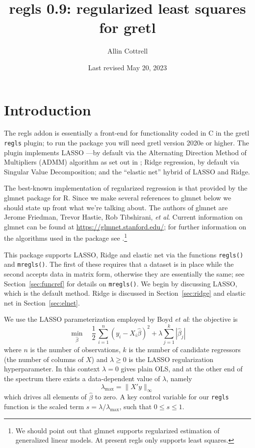 \documentclass{article}
\title{regls 0.9: regularized least squares for gretl}
\author{Allin Cottrell}
\date{Last revised May 20, 2023}
\begin{document}
\maketitle

\section{Introduction}
\label{sec:intro}

The \textsf{regls} addon is essentially a front-end for functionality
coded in C in the gretl \texttt{regls} plugin; to run the package you
will need gretl version 2020e or higher.  The plugin implements LASSO
\citep{tibshirani96}---by default via the Alternating Direction Method
of Multipliers (ADMM) algorithm as set out in \cite{boyd2010}; Ridge
regression, by default via Singular Value Decomposition; and the
``elastic net'' hybrid of LASSO and Ridge.

The best-known implementation of regularized regression is that
provided by the \textsf{glmnet} package for \textsf{R}. Since we make
several references to \textsf{glmnet} below we should state up front
what we're talking about. The authors of \textsf{glmnet} are Jerome
Friedman, Trevor Hastie, Rob Tibshirani, \textit{et al}.  Current
information on \textsf{glmnet} can be found at
\url{https://glmnet.stanford.edu/}; for further information on the
algorithms used in the package see \cite{glmnet10}.\footnote{We should
  point out that \textsf{glmnet} supports regularized estimation of
  generalized linear models. At present \textsf{regls} only supports
  least squares.}

This package supports LASSO, Ridge and elastic net via the functions
\texttt{regls()} and \texttt{mregls()}. The first of these requires
that a dataset is in place while the second accepts data in matrix
form, otherwise they are essentially the same; see
Section~\ref{sec:funcref} for details on \texttt{mregls()}.  We begin
by discussing LASSO, which is the default method.  Ridge is discussed
in Section~\ref{sec:ridge} and elastic net in Section~\ref{sec:elnet}.

We use the LASSO parameterization employed by Boyd \textit{et al}: the
objective is
\begin{equation}
  \label{eq:obj}
  \min_{\hat{\beta}} \quad \frac{1}{2}\,
  \sum_{i=1}^n (y_i - X_i\hat{\beta})^2 + \lambda \sum_{j=1}^k |\hat{\beta}_j|
\end{equation}
where $n$ is the number of observations, $k$ is the number of
candidate regressors (the number of columns of $X$) and
$\lambda \geq 0$ is the LASSO regularization hyperparameter. In this
context $\lambda = 0$ gives plain OLS, and at the other end of the
spectrum there exists a data-dependent value of $\lambda$, namely
\begin{equation}
  \label{eq:lmax}
  \lambda_{\max} = \|X'y\|_{\infty}
\end{equation}
which drives all elements of $\hat{\beta}$ to zero.  A key control
variable for our \texttt{regls} function is the scaled term
$s = \lambda/\lambda_{\max}$, such that $0 \leq s \leq 1$.
\end{document}

